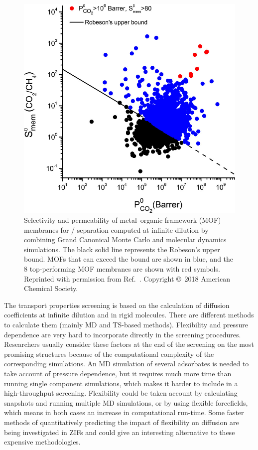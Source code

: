 \documentclass[main.tex]{subfiles}
\begin{document}
\begin{figure}[ht]
\centering
  \includegraphics[width=0.5\linewidth]{figures/1-screening/Altintas_2018.jpeg}
  \caption{Selectivity and permeability of metal--organic framework (MOF) membranes for / separation computed at infinite dilution by combining Grand Canonical Monte Carlo and molecular dynamics simulations.\autocite{Altintas_2018} The black solid line represents the Robeson's upper bound.\autocite{robeson1991correlation, Robeson_2008} MOFs that can exceed the bound are shown in blue, and the 8 top-performing MOF membranes are shown with red symbols. Reprinted with permission from Ref.~\cite{Altintas_2018}. Copyright \copyright\  2018 American Chemical Society.}\label{fgr:Altintas_2018}
\end{figure}

The transport properties screening is based on the calculation of diffusion coefficients at infinite dilution and in rigid molecules. There are different methods to calculate them (mainly MD and TS-based methods). Flexibility and pressure dependence are very hard to incorporate directly in the screening procedures. Researchers usually consider these factors at the end of the screening on the most promising structures because of the computational complexity of the corresponding simulations. An MD simulation of several adsorbates is needed to take account of pressure dependence, but it requires much more time than running single component simulations,\autocite{Keskin_2007, Keskin_2009} which makes it harder to include in a high-throughput screening. Flexibility could be taken account by calculating snapshots and running multiple MD simulations, or by using flexible forcefields, which means in both cases an increase in computational run-time. Some faster methods of quantitatively predicting the impact of flexibility on diffusion are being investigated in ZIFs and could give an interesting alternative to these expensive methodologies.\autocite{Han_2020}
\end{document}

